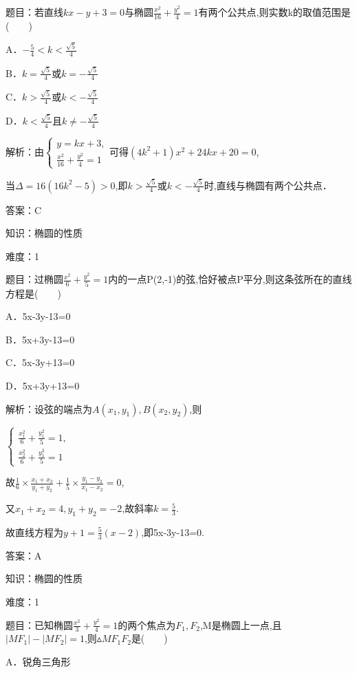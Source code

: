 \documentclass{article} %
\begin{document}
题目：若直线$kx-y+3=0$与椭圆$\frac{x^2}{16}+\frac{y^2}{4}=1$有两个公共点,则实数k的取值范围是(　　)

A．$-\frac{5}{4}<k<\frac{\sqrt{5}}{4}$   

B．$k=\frac{\sqrt{5}}{4}$或$k=-\frac{\sqrt{5}}{4}$

C．$k>\frac{\sqrt{5}}{4}$或$k<-\frac{\sqrt{5}}{4}$   

D．$k<\frac{\sqrt{5}}{4}$且$k\ne -\frac{\sqrt{5}}{4}$

解析：由$\left\{
\begin{array}{l}
y=kx+3, \\
\frac{x^2}{16}+\frac{y^2}{4}=1
\end{array}
\right.$可得$(4k^2+1)x^2+24kx+20=0$,

当$\Delta=16(16k^{2}-5)>0$,即$k>\frac{\sqrt{5}}{4}$或$k<-\frac{\sqrt{5}}{4}$时,直线与椭圆有两个公共点．

答案：C



知识：椭圆的性质

难度：1

题目：过椭圆$\frac{x^2}{6}+\frac{y^2}{5}=1$内的一点P(2,-1)的弦,恰好被点P平分,则这条弦所在的直线方程是(　　)

A．5x-3y-13=0   

B．5x+3y-13=0

C．5x-3y+13=0   

D．5x+3y+13=0

解析：设弦的端点为$A(x_{1},y_{1}),B(x_{2},y_{2})$,则

$\left\{
\begin{array}{l}
\frac{x_1^2}{6}+\frac{y_1^2}{5}=1, \\
\frac{x_2^2}{6}+\frac{y_1^2}{5}=1
\end{array}
\right.$

故$\frac{1}{6}\times \frac{x_1+x_2}{y_1+y_2}+\frac{1}{5}\times \frac{y_1-y_2}{x_1-x_2}=0$,

又$x_{1}+x_{2}=4,y_{1}+y_{2}=-2$,故斜率$k=\frac{5}{3}$.

故直线方程为$y+1=\frac{5}{3}(x-2)$,即5x-3y-13=0.

答案：A



知识：椭圆的性质

难度：1

题目：已知椭圆$\frac{x^2}{3}+\frac{y^2}{4}=1$的两个焦点为$F_{1},F_{2}$,M是椭圆上一点,且$|MF_1|-|MF_2|=1$,则${\vartriangle}MF_{1}F_{2}$是(　　)

A．锐角三角形   
\end{document}

